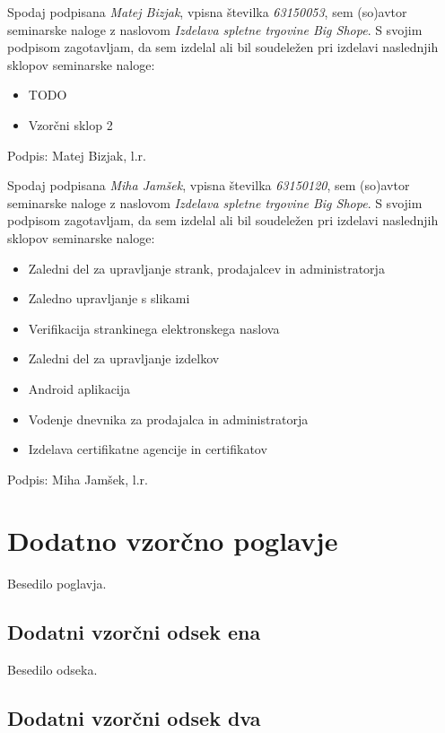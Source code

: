 \documentclass[a4paper,12pt]{report}
\newcommand{\naslov}     {Izdelava spletne trgovine Big Shope}
\newcommand{\drugiavtor} {Matej Bizjak}
\newcommand{\drugiindeks}{63150053}
\newcommand{\tretjiavtor} {Miha Jamšek}
\newcommand{\tretjiindeks}{63150120}
\begin{document}
Spodaj podpisana \textit{\drugiavtor}, vpisna številka \textit{\drugiindeks}, sem (so)avtor seminarske naloge z naslovom \textit{\naslov}. S svojim podpisom zagotavljam, da sem izdelal ali bil soudeležen pri izdelavi naslednjih sklopov seminarske naloge:
\begin{itemize}
    \item TODO
    \item Vzorčni sklop 2
\end{itemize}

Podpis: {\drugiavtor}, l.r.

\newpage

Spodaj podpisana \textit{\tretjiavtor}, vpisna številka \textit{\tretjiindeks}, sem (so)avtor seminarske naloge z naslovom \textit{\naslov}. S svojim podpisom zagotavljam, da sem izdelal ali bil soudeležen pri izdelavi naslednjih sklopov seminarske naloge:
\begin{itemize}
    \item Zaledni del za upravljanje strank, prodajalcev in administratorja
    \item Zaledno upravljanje s slikami
    \item Verifikacija strankinega elektronskega naslova
    \item Zaledni del za upravljanje izdelkov
    \item Android aplikacija
    \item Vodenje dnevnika za prodajalca in administratorja
    \item Izdelava certifikatne agencije in certifikatov
\end{itemize}

Podpis: {\tretjiavtor}, l.r.

\chapter{Dodatno vzorčno poglavje}

Besedilo poglavja.

\section{Dodatni vzorčni odsek ena}

Besedilo odseka.

\section{Dodatni vzorčni odsek dva}
\end{document}
